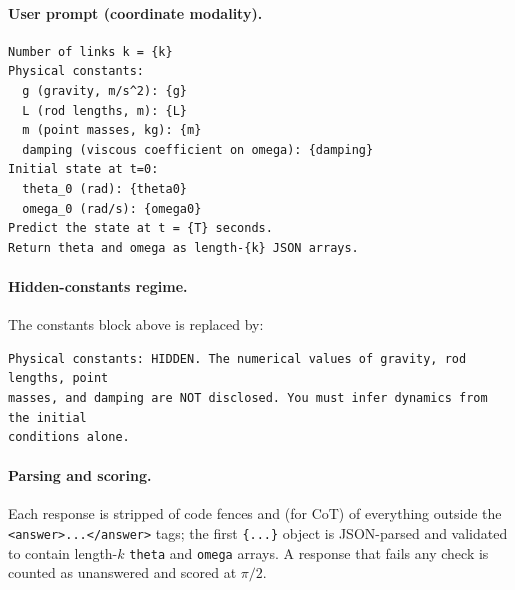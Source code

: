 \documentclass{article}
\begin{document}
\paragraph{User prompt (coordinate modality).}
\begin{small}\begin{verbatim}
Number of links k = {k}
Physical constants:
  g (gravity, m/s^2): {g}
  L (rod lengths, m): {L}
  m (point masses, kg): {m}
  damping (viscous coefficient on omega): {damping}
Initial state at t=0:
  theta_0 (rad): {theta0}
  omega_0 (rad/s): {omega0}
Predict the state at t = {T} seconds.
Return theta and omega as length-{k} JSON arrays.
\end{verbatim}\end{small}

\paragraph{Hidden-constants regime.} The constants block above is replaced by:
\begin{small}\begin{verbatim}
Physical constants: HIDDEN. The numerical values of gravity, rod lengths, point
masses, and damping are NOT disclosed. You must infer dynamics from the initial
conditions alone.
\end{verbatim}\end{small}

\paragraph{Parsing and scoring.} Each response is stripped of code fences and (for CoT) of
everything outside the \texttt{<answer>...</answer>} tags; the first \texttt{\{...\}} object
is JSON-parsed and validated to contain length-$k$ \texttt{theta} and \texttt{omega} arrays.
A response that fails any check is counted as unanswered and scored at $\pi/2$.
\end{document}
